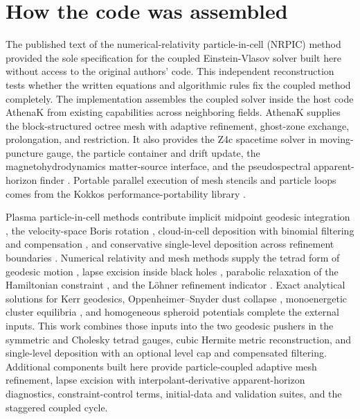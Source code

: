 \section{How the code was assembled}\label{sec:assembly}

The published text of the numerical-relativity particle-in-cell (NRPIC) method \cite{Wu:2026nrpic} provided the sole specification for the coupled Einstein-Vlasov solver built here without access to the original authors' code. This independent reconstruction tests whether the written equations and algorithmic rules fix the coupled method completely. The implementation assembles the coupled solver inside the host code AthenaK \cite{2026ApJS..283...27S,Zhu:2024utz} from existing capabilities across neighboring fields. AthenaK supplies the block-structured octree mesh with adaptive refinement, ghost-zone exchange, prolongation, and restriction. It also provides the Z4c spacetime solver in moving-puncture gauge, the particle container and drift update, the magnetohydrodynamics matter-source interface, and the pseudospectral apparent-horizon finder \cite{2026ApJS..283...27S,Zhu:2024utz}. Portable parallel execution of mesh stencils and particle loops comes from the Kokkos performance-portability library \cite{2022ITPDS..33..805T}.

Plasma particle-in-cell methods contribute implicit midpoint geodesic integration \cite{Bacchini:2020cze}, the velocity-space Boris rotation \cite{boris1970relativistic,1991ppcs.book.....B}, cloud-in-cell deposition with binomial filtering and compensation \cite{1988csup.book.....H,1991ppcs.book.....B}, and conservative single-level deposition across refinement boundaries \cite{Myers:2021gfn}. Numerical relativity and mesh methods supply the tetrad form of geodesic motion \cite{Olivares:2021cfa,Boyeneni:2025tsx}, lapse excision inside black holes \cite{Rosswog:2023nnl}, parabolic relaxation of the Hamiltonian constraint \cite{Duez:2002bn,Etienne:2024ncu}, and the L\"ohner refinement indicator \cite{1987CMAME..61..323L}. Exact analytical solutions for Kerr geodesics, Oppenheimer--Snyder dust collapse \cite{Oppenheimer:1939ue}, monoenergetic cluster equilibria \cite{1985ApJ...298...34S}, and homogeneous spheroid potentials complete the external inputs. This work combines those inputs into the two geodesic pushers in the symmetric and Cholesky tetrad gauges, cubic Hermite metric reconstruction, and single-level deposition with an optional level cap and compensated filtering. Additional components built here provide particle-coupled adaptive mesh refinement, lapse excision with interpolant-derivative apparent-horizon diagnostics, constraint-control terms, initial-data and validation suites, and the staggered coupled cycle.


